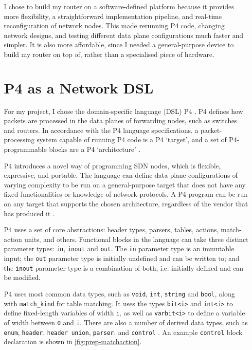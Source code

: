 I chose to build my router on a software-defined platform because it provides more flexibility, a straightforward implementation pipeline, and real-time reconfiguration of network nodes. This made rerunning P4 code, changing network designs, and testing different data plane configurations much faster and simpler. It is also more affordable, since I  needed a general-purpose device to build my router on top of, rather than a specialised piece of hardware.



\section{P4 as a Network DSL}
\label{sec:2.2}
For my project, I chose the domain-specific language (DSL) P4 \cite{P4Paper}. P4 defines how packets are processed in the data planes of forwarding nodes, such as switches and routers. In accordance with the P4 language specifications, a packet-processing system capable of running P4 code is a P4 ‘target’, and a set of P4-programmable blocks are a P4 ‘architecture’ \cite{P4LangSpecs}.

P4 introduces a novel way of programming SDN nodes, which is flexible, expressive, and portable. The language can define data plane configurations of varying complexity to be run on a general-purpose target that does not have any fixed functionalities or knowledge of network protocols. A P4 program can be run on any target that supports the chosen architecture, regardless of the vendor that has produced it \cite{P4LangSpecs}.

P4 uses a set of core abstractions: header types, parsers, tables, actions, match-action units, and others. Functional blocks in the language can take three distinct parameter types: \texttt{in}, \texttt{inout} and \texttt{out}. The \texttt{in} parameter type is an immutable input; the \texttt{out} parameter type is initially undefined and can be written to; and the \texttt{inout} parameter type is a combination of both, i.e. initially defined and can be modified.

P4 uses most common data types, such as \texttt{void}, \texttt{int}, \texttt{string} and \texttt{bool}, along with \texttt{match\_kind} for table matching. It uses the types \texttt{bit<i>} and \texttt{int<i>} to define fixed-length variables of width \texttt{i}, as well as \texttt{varbit<i>} to define a variable of width between \texttt{0} and \texttt{i}. There are also a number of derived data types, such as \texttt{enum}, \texttt{header}, \texttt{header union}, \texttt{parser}, and \texttt{control} \cite{P4LangSpecs}. An example \texttt{control} block declaration is shown in \cref{fig:prep-matchaction}.

